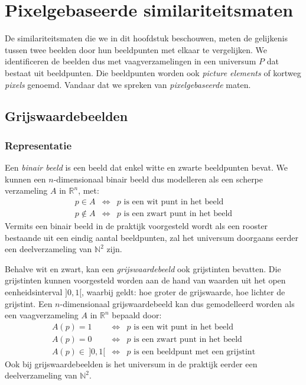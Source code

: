 \chapter{Pixelgebaseerde similariteitsmaten}

De similariteitsmaten die we in dit hoofdstuk beschouwen,
meten de gelijkenis tussen twee beelden door hun beeldpunten met elkaar te vergelijken.
We identificeren de beelden dus met vaagverzamelingen in een universum $P$ dat bestaat uit 
beeldpunten. Die beeldpunten worden ook \emph{picture elements} of kortweg \emph{pixels} genoemd. 
Vandaar dat we spreken van \emph{pixelgebaseerde} maten.

\section{Grijswaardebeelden}

\subsection{Representatie}

Een \emph{binair beeld} is een beeld dat enkel witte en zwarte beeldpunten bevat. We kunnen een 
$n$-dimensionaal binair beeld dus modelleren als een scherpe verzameling $A$ in $\mathbb{R}^n$, met:
$$
\begin{array}{rcl}
p \in A & \iff & p \textrm{ is een wit punt in het beeld} \\
p \notin A & \iff & p \textrm{ is een zwart punt in het beeld}
\end{array}
$$ 
Vermits een binair beeld in de praktijk voorgesteld wordt als een rooster bestaande uit een
eindig aantal beeldpunten, zal het universum doorgaans eerder een deelverzameling van $\mathbb{N}^2$ zijn.

Behalve wit en zwart, kan een \emph{grijswaardebeeld} ook grijstinten bevatten. Die grijstinten
kunnen voorgesteld worden aan de hand van waarden uit het open eenheidsinterval $]0,1[$, waarbij
geldt: hoe groter de grijswaarde, hoe lichter de grijstint. Een $n$-dimensionaal grijswaardebeeld
kan dus gemodelleerd worden als een vaagverzameling $A$ in $\mathbb{R}^n$ bepaald door:
$$
\begin{array}{rcl}
A(p) = 1 & \iff & p \textrm{ is een wit punt in het beeld} \\
A(p) = 0 & \iff & p \textrm{ is een zwart punt in het beeld} \\
A(p) \in\ ]0,1[ & \iff & p \textrm{ is een beeldpunt met een grijstint}
\end{array}
$$
Ook bij grijswaardebeelden is het universum in de praktijk eerder een deelverzameling van $\mathbb{N}^2$.

